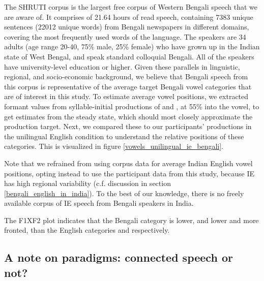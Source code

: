 \documentclass[12 pt]{article}
\newcommand{\nt}[1]{\textipa{[#1]}} %
\begin{document}
The SHRUTI corpus is the largest free corpus of Western Bengali speech that we are aware of. It comprises of 21.64 hours of read speech, containing 7383 unique sentences (22012 unique words) from Bengali newspapers in different domains, covering the most frequently used words of the language. The speakers are 34 adults (age range 20-40, 75\% male, 25\% female) who have grown up in the Indian state of West Bengal, and speak standard colloquial Bengali. All of the speakers have university-level education or higher. Given these parallels in linguistic, regional, and socio-economic background, we believe that Bengali speech from this corpus is representative of the average target Bengali vowel categories that are of interest in this study.
To estimate average vowel positions, we extracted formant values from syllable-initial productions of \nt{\ae} and \nt{a:}, at 55\% into the vowel, to get estimates from the steady state, which should most closely approximate the production target. Next, we compared these to our participants' productions in the unilingual English condition to understand the relative positions of these categories. This is visualized in figure \ref{vowels_unilingual_ie_bengali}. 

Note that we refrained from using corpus data for average Indian English vowel positions, opting instead to use the participant data from this study, because IE has high regional variability (c.f. discussion in section \ref{bengali_english_in_india}). To the best of our knowledge, there is no freely available corpus of IE speech from Bengali speakers in India. 

The F1XF2 plot indicates that the Bengali category \nt{\ae} is lower, and \nt{a:} lower and more fronted, than the English categories \nt{\ae} and \nt{2} respectively. 

\subsection{A note on paradigms: connected speech or not?} \label{paradigms}
\end{document}
